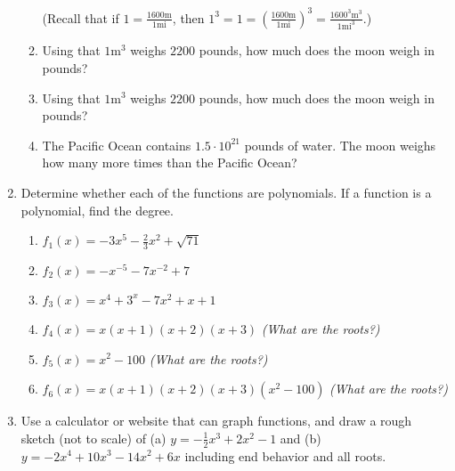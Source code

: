 \documentclass[12 pt]{article}
\begin{document}
\begin{enumerate}
\begin{enumerate}
      (Recall that if $\displaystyle 1 = \frac{1600 \text{m}}{1 \text{mi}}$, then $\displaystyle 1^3 = 1 = \left(\frac{1600 \text{m}}{1 \text{mi}}\right)^3 = \frac{1600^3 \text{m}^3}{1 \text{mi}^3}.$)
      \\ \vspace{3cm}
      \item Using that $1\text{m}^3$ weighs $2200$ pounds, how much does the moon weigh in pounds?
      \\ \vspace{3cm}
      \item Using that $1\text{m}^3$ weighs $2200$ pounds, how much does the moon weigh in pounds?
      \\ \vspace{3cm}
      \item The Pacific Ocean contains $1.5 \cdot 10^{21}$ pounds of water. The moon weighs how many more times than the Pacific Ocean?
    \end{enumerate}
    \pagebreak
    \item Determine whether each of the functions are polynomials. If a function is a polynomial, find the degree.
    \begin{enumerate}
      \item $f_1(x) = -3x^5 -\frac{2}{3}x^2 + \sqrt{71}$
      \\ \vspace{1cm}
      \item $f_2(x) = -x^{-5} -7x^{-2} + 7$
      \\ \vspace{1cm}
      \item $f_3(x) = x^4 + 3^x - 7x^2 + x + 1$
      \\ \vspace{1cm}
      \item $f_4(x) = x(x+1)(x+2)(x+3)$ \hfill \textit{(What are the roots?)}
      \\ \vspace{1cm}
      \item $f_5(x) = x^2 - 100$ \hfill \textit{(What are the roots?)}
      \\ \vspace{1cm}
      \item $f_6(x) = x(x+1)(x+2)(x+3)(x^2 - 100)$ \hfill \textit{(What are the roots?)}
      \\ \vspace{1cm}
    \end{enumerate}
    \item Use a calculator or website that can graph functions, and draw a rough sketch (not to scale) of (a) $y = -\frac12x^3 +2x^2 -1$ and (b) $y = -2x^4 + 10x^3 - 14x^2 + 6x$ including end behavior and all roots.\\

\end{enumerate}
\end{document}
